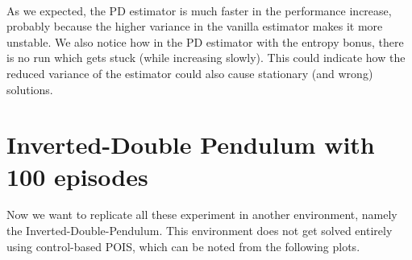\documentclass[11pt]{article}
\begin{document}
    \begin{center}
    \end{center}
    { \hspace*{\fill} \\}
    
    As we expected, the PD estimator is much faster in the performance
increase, probably because the higher variance in the vanilla estimator
makes it more unstable. We also notice how in the PD estimator with the
entropy bonus, there is no run which gets stuck (while increasing
slowly). This could indicate how the reduced variance of the estimator
could also cause stationary (and wrong) solutions.

    \hypertarget{inverted-double-pendulum-with-100-episodes}{%
\section{Inverted-Double Pendulum with 100
episodes}\label{inverted-double-pendulum-with-100-episodes}}

Now we want to replicate all these experiment in another environment,
namely the Inverted-Double-Pendulum. This environment does not get
solved entirely using control-based POIS, which can be noted from the
following plots.
\end{document}
